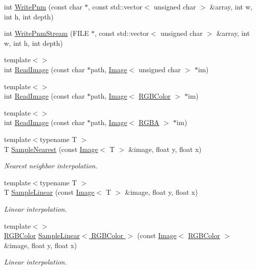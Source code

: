 \begin{DoxyCompactItemize}
\item 
int \hyperlink{namespacelibs_a6a898fc190fcae0d8e80b15643ac80bf}{Write\+Pnm} (const char $\ast$, const std\+::vector$<$ unsigned char $>$ \&array, int w, int h, int depth)
\item 
int \hyperlink{namespacelibs_ae8cc629b87a1c7373faf53b42cecbe55}{Write\+Pnm\+Stream} (F\+I\+L\+E $\ast$, const std\+::vector$<$ unsigned char $>$ \&array, int w, int h, int depth)
\item 
{\footnotesize template$<$$>$ }\\int \hyperlink{namespacelibs_abf82a4e75a7c51affb5ada5bbb6713c2}{Read\+Image} (const char $\ast$path, \hyperlink{classImage}{Image}$<$ unsigned char $>$ $\ast$im)
\item 
{\footnotesize template$<$$>$ }\\int \hyperlink{namespacelibs_afeeb48d777be860b4e04064a1080fa37}{Read\+Image} (const char $\ast$path, \hyperlink{classImage}{Image}$<$ \hyperlink{pixelTypes_8hpp_a0bffee690fce7a74e4191ec31022d33b}{R\+G\+B\+Color} $>$ $\ast$im)
\item 
{\footnotesize template$<$$>$ }\\int \hyperlink{namespacelibs_a3550905ac3a9a44683369036b8913bf2}{Read\+Image} (const char $\ast$path, \hyperlink{classImage}{Image}$<$ \hyperlink{classRGBA}{R\+G\+B\+A} $>$ $\ast$im)
\item 
{\footnotesize template$<$typename T $>$ }\\T \hyperlink{namespacelibs_a909774f9c13df8aef0075c534aa1ede0}{Sample\+Nearest} (const \hyperlink{classImage}{Image}$<$ T $>$ \&image, float y, float x)
\begin{DoxyCompactList}\small\item\em Nearest neighbor interpolation. \end{DoxyCompactList}\item 
{\footnotesize template$<$typename T $>$ }\\T \hyperlink{namespacelibs_ad5d5848a49cd969db3fcbd18427a0cdc}{Sample\+Linear} (const \hyperlink{classImage}{Image}$<$ T $>$ \&image, float y, float x)
\begin{DoxyCompactList}\small\item\em Linear interpolation. \end{DoxyCompactList}\item 
{\footnotesize template$<$$>$ }\\\hyperlink{pixelTypes_8hpp_a0bffee690fce7a74e4191ec31022d33b}{R\+G\+B\+Color} \hyperlink{namespacelibs_a5acb3d8357a8674bde80446bb8bf7b41}{Sample\+Linear$<$ R\+G\+B\+Color $>$} (const \hyperlink{classImage}{Image}$<$ \hyperlink{pixelTypes_8hpp_a0bffee690fce7a74e4191ec31022d33b}{R\+G\+B\+Color} $>$ \&image, float y, float x)
\begin{DoxyCompactList}\small\item\em Linear interpolation. \end{DoxyCompactList}\end{DoxyCompactItemize}


